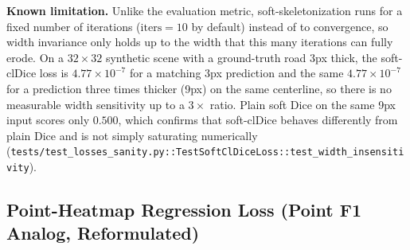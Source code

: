 \textbf{Known limitation.} Unlike the evaluation metric, soft-skeletonization runs for a fixed
number of iterations ($\mathrm{iters}=10$ by default) instead of to convergence, so width
invariance only holds up to the width that this many iterations can fully erode. On a
$32\times32$ synthetic scene with a ground-truth road 3px thick, the
soft-clDice loss is $4.77\times10^{-7}$ for a matching 3px prediction and the same
$4.77\times10^{-7}$ for a prediction three times thicker (9px) on the same centerline, so there is
no measurable width sensitivity up to a $3\times$ ratio. Plain soft Dice on the same 9px input
scores only $0.500$, which confirms that soft-clDice behaves differently from plain Dice and is not
simply saturating numerically
(\texttt{tests/test\_losses\_sanity.py::\allowbreak{}TestSoftClDiceLoss::\allowbreak{}test\_width\_insensitivity}).

\subsection{Point-Heatmap Regression Loss (Point F1 Analog, Reformulated)}
\label{subsec:heatmap-loss}

